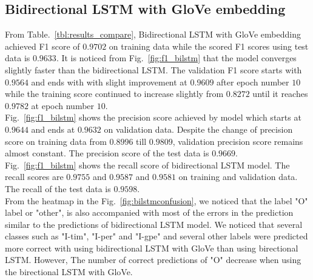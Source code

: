 \documentclass[sigconf, nonacm, natbib, screen, balance=False]{acmart}
\begin{document}
\subsection{Bidirectional LSTM with GloVe embedding}
From Table.~\ref{tbl:results_compare}, Bidirectional LSTM with GloVe embedding achieved F1 score of $0.9702$ on training data while the scored F1 scores using test data is $0.9633$. It is noticed from Fig.~\ref{fig:f1_bilstm} that the model converges slightly faster than the bidirectional LSTM. The validation F1 score starts with $0.9564$ and ends with with slight improvement at $0.9609$ after epoch number $10$ while the training score continued to increase slightly from $0.8272$ until it reaches $0.9782$ at epoch number $10$.
\hfill\\
Fig.~\ref{fig:f1_bilstm} shows the precision score achieved by model which starts at $0.9644$ and ends at $0.9632$ on validation data. Despite the change of precision score on training data from $0.8996$ till $0.9809$, validation precision score remains almost constant. The precision score of the test data is $0.9669$.    
\hfill\\
Fig.~\ref{fig:f1_bilstm} shows the recall score of bidirectional LSTM model. The recall scores are $0.9755$ and $0.9587$ and $0.9581$ on training and validation data. The recall of the test data is $0.9598$.
\hfill\\
From the heatmap in the Fig.~\ref{fig:bilstmconfusion}, we noticed that the label "O" label or "other", is also accompanied with most of the errors in the prediction similar to the predictions of bidirectional LSTM model. We noticed that several classes such as "I-tim", "I-per" and "I-gpe" and several other labels were predicted more correct with using bidirectional LSTM with GloVe than using birectional LSTM. However, The number of correct predictions of "O" decrease when using the  birectional LSTM with GloVe.  
\end{document}
